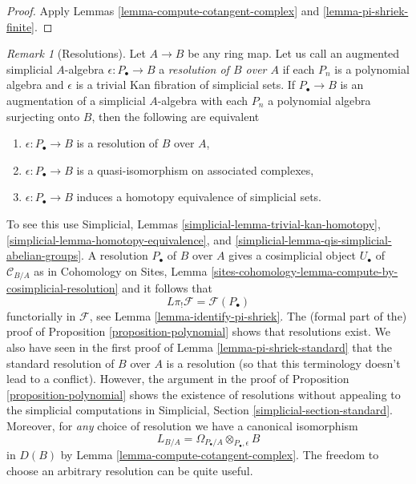 \documentclass{stacks-project}
\theoremstyle{plain}
\theoremstyle{definition}
\theoremstyle{remark}
\newtheorem{remark}[subsection]{Remark}
\numberwithin{equation}{subsection}
\begin{document}
\begin{proof}
Apply Lemmas \ref{lemma-compute-cotangent-complex} and
\ref{lemma-pi-shriek-finite}.
\end{proof}

\begin{remark}[Resolutions]
\label{remark-resolution}
Let $A \to B$ be any ring map. Let us call an augmented simplicial $A$-algebra
$\epsilon : P_\bullet \to B$ a {\it resolution of $B$ over $A$} if
each $P_n$ is a polynomial algebra and $\epsilon$ is a trivial Kan fibration
of simplicial sets. If $P_\bullet \to B$ is an augmentation of a simplicial
$A$-algebra with each $P_n$ a polynomial algebra surjecting onto $B$, then
the following are equivalent
\begin{enumerate}
\item $\epsilon : P_\bullet \to B$ is a resolution of $B$ over $A$,
\item $\epsilon : P_\bullet \to B$ is a quasi-isomorphism on
associated complexes,
\item $\epsilon : P_\bullet \to B$ induces a homotopy equivalence
of simplicial sets.
\end{enumerate}
To see this use Simplicial, Lemmas
\ref{simplicial-lemma-trivial-kan-homotopy},
\ref{simplicial-lemma-homotopy-equivalence}, and
\ref{simplicial-lemma-qis-simplicial-abelian-groups}.
A resolution $P_\bullet$ of $B$ over $A$ gives a cosimplicial object
$U_\bullet$ of $\mathcal{C}_{B/A}$ as in Cohomology on Sites, Lemma
\ref{sites-cohomology-lemma-compute-by-cosimplicial-resolution}
and it follows that
$$
L\pi_!\mathcal{F} = \mathcal{F}(P_\bullet)
$$
functorially in $\mathcal{F}$, see Lemma \ref{lemma-identify-pi-shriek}.
The (formal part of the) proof of Proposition \ref{proposition-polynomial}
shows that resolutions exist. We also have seen in the first proof of
Lemma \ref{lemma-pi-shriek-standard} that the standard resolution of $B$
over $A$ is a resolution (so that this terminology doesn't lead to a conflict).
However, the argument in the proof of Proposition \ref{proposition-polynomial}
shows the existence of resolutions without appealing to the simplicial
computations in Simplicial, Section \ref{simplicial-section-standard}.
Moreover, for {\it any} choice of resolution we have a canonical isomorphism
$$
L_{B/A} = \Omega_{P_\bullet/A} \otimes_{P_\bullet, \epsilon} B
$$
in $D(B)$ by Lemma \ref{lemma-compute-cotangent-complex}. The freedom to
choose an arbitrary resolution can be quite useful.
\end{remark}
\end{document}
